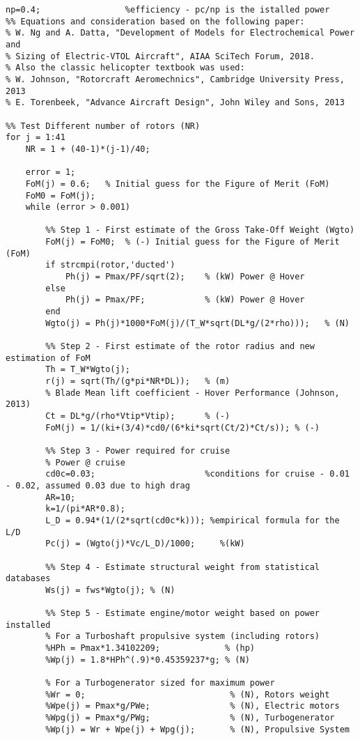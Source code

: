 \begin{verbatim}
np=0.4;                 %efficiency - pc/np is the istalled power
%% Equations and consideration based on the following paper:
% W. Ng and A. Datta, "Development of Models for Electrochemical Power and
% Sizing of Electric-VTOL Aircraft", AIAA SciTech Forum, 2018.
% Also the classic helicopter textbook was used:
% W. Johnson, "Rotorcraft Aeromechnics", Cambridge University Press, 2013
% E. Torenbeek, "Advance Aircraft Design", John Wiley and Sons, 2013

%% Test Different number of rotors (NR)
for j = 1:41
    NR = 1 + (40-1)*(j-1)/40;

    error = 1;
    FoM(j) = 0.6;	% Initial guess for the Figure of Merit (FoM)
    FoM0 = FoM(j);
    while (error > 0.001)

        %% Step 1 - First estimate of the Gross Take-Off Weight (Wgto)
        FoM(j) = FoM0;	% (-) Initial guess for the Figure of Merit (FoM)
        if strcmpi(rotor,'ducted')
            Ph(j) = Pmax/PF/sqrt(2);	% (kW) Power @ Hover
        else
            Ph(j) = Pmax/PF;            % (kW) Power @ Hover
        end
        Wgto(j) = Ph(j)*1000*FoM(j)/(T_W*sqrt(DL*g/(2*rho)));   % (N)

        %% Step 2 - First estimate of the rotor radius and new estimation of FoM
        Th = T_W*Wgto(j);
        r(j) = sqrt(Th/(g*pi*NR*DL));	% (m)
        % Blade Mean lift coefficient - Hover Performance (Johnson, 2013)
        Ct = DL*g/(rho*Vtip*Vtip);      % (-)
        FoM(j) = 1/(ki+(3/4)*cd0/(6*ki*sqrt(Ct/2)*Ct/s)); % (-)

        %% Step 3 - Power required for cruise
        % Power @ cruise
        cd0c=0.03;                      %conditions for cruise - 0.01 - 0.02, assumed 0.03 due to high drag
        AR=10;
        k=1/(pi*AR*0.8);
        L_D = 0.94*(1/(2*sqrt(cd0c*k))); %empirical formula for the L/D
        Pc(j) = (Wgto(j)*Vc/L_D)/1000;     %(kW)

        %% Step 4 - Estimate structural weight from statistical databases
        Ws(j) = fws*Wgto(j); % (N)

        %% Step 5 - Estimate engine/motor weight based on power installed
        % For a Turboshaft propulsive system (including rotors)
        %HPh = Pmax*1.34102209;             % (hp)
        %Wp(j) = 1.8*HPh^(.9)*0.45359237*g;	% (N)

        % For a Turbogenerator sized for maximum power
        %Wr = 0;                             % (N), Rotors weight
        %Wpe(j) = Pmax*g/PWe;                % (N), Electric motors
        %Wpg(j) = Pmax*g/PWg;                % (N), Turbogenerator
        %Wp(j) = Wr + Wpe(j) + Wpg(j);       % (N), Propulsive System


\end{verbatim}
